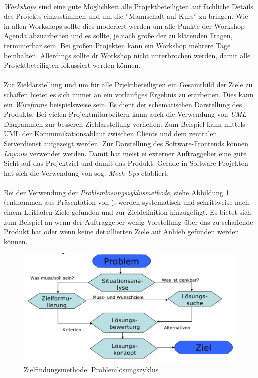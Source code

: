 \documentclass[11pt]{scrartcl}
\begin{document}
\\
\textit{Workshops} sind eine gute Möglichkeit alle Projektbeteiligten auf fachliche Details des Projekts einzustimmen und um die ''Mannschaft auf Kurs'' zu bringen. Wie in allen Workshops sollte dies moderiert werden um alle Punkte der Workshop-Agenda abzuarbeiten und es sollte, je nach größe der zu klärenden Fragen, terminierbar sein. Bei großen Projekten kann ein Workshop mehrere Tage beinhalten. Allerdings sollte dr Workshop nicht unterbrochen werden, damit alle Projektbeteiligten fokussiert werden können. \\
\\
Zur Zieldarstellung und um für alle Prjektbeteiligten ein Gesamtbild der Ziele zu schaffen bietet es sich immer an ein vorläufiges Ergebnis zu erarbeiten. Dies kann ein \textit{Wireframe} beispielsweise sein. Es dient der schematischen Darstellung des Produkts. Bei vielen Projektmitarbeitern kann auch die Verwendung von \textit{UML}-Diagrammen zur besseren Zieldarstellung verhelfen. Zum Beispiel kann mittels UML der Kommunikationsablauf zwischen Clients und dem zentralen Serverdienst aufgezeigt werden. Zur Darstellung des Software-Frontends können \textit{Layouts} verwendet werden. Damit hat meist ei externer Auftraggeber eine gute Sicht auf das Projektziel und damit das Produkt. Gerade in Software-Projekten hat sich die Verwendung von sog. \textit{Moch-Ups} etabliert. \\
\\
Bei der Verwendung der \textit{Problemlösungszyklusmethode}, siehe Abbildung \ref{probsolcycle} (entnommen aus Präsentation von \cite{slishare_einf_pm}), werden systematisch und schrittweise nach einem Leitfaden Ziele gefunden und zur Zieldefinition hinzugefügt. Es bietet sich zum Beispiel an wenn der Auftraggeber wenig Vorstellung über das zu schaffende Produkt hat oder wenn keine detaillierten Ziele auf Anhieb gefunden werden können. 

\begin{figure}[H]
	\begin{center}
		\includegraphics[width=1.0\textwidth]{img/problemloesungszyklus}
		\caption{Zielfindungsmethode: Problemlösungszyklus}
		\label{probsolcycle}	
	\end{center}
\end{figure}
\end{document}

